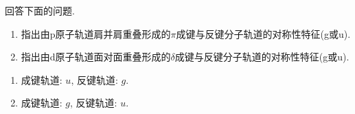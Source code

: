 \documentclass{ctexart}
\begin{document}
\begin{homework}[6.]
    回答下面的问题.
    \begin{enumerate}[label=\tbf{(\alph*)}]
        \item 指出由p原子轨道肩并肩重叠形成的$\pi$成键与反键分子轨道的对称性特征(g或u).
        \item 指出由d原子轨道面对面重叠形成的$\delta$成键与反键分子轨道的对称性特征(g或u).
    \end{enumerate}
\end{homework}
\begin{solution}
    \begin{enumerate}[label=\tbf{(\alph*)}]
        \item 成键轨道: $u$, 反键轨道: $g$.
        \item 成键轨道: $g$, 反键轨道: $u$.
    \end{enumerate}
\end{solution}
\end{document}
